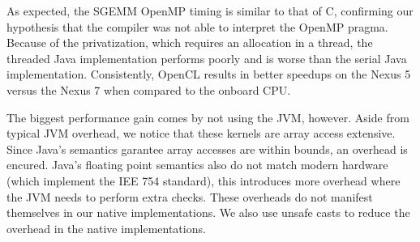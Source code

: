 As expected, the SGEMM OpenMP timing is similar to that of C, confirming our hypothesis that the compiler was not able
  to interpret the OpenMP pragma.
Because of the privatization, which requires an allocation in a thread, the threaded Java implementation performs poorly and is 
  worse than the serial Java implementation.
Consistently, OpenCL results in better speedups on the Nexus 5 versus the Nexus 7 when compared to the onboard CPU. 

The biggest performance gain comes by not using the JVM, however.
Aside from typical JVM overhead, we notice that these kernels are array access extensive.
Since Java's semantics garantee array accesses are within bounds, an overhead is encured.
Java's floating point semantics also do not match modern hardware (which implement the IEE 754 standard),
  this introduces more overhead where the JVM needs to perform extra checks.
These overheads do not manifest themselves in our native implementations.
We also use unsafe casts to reduce the overhead in the native implementations.


